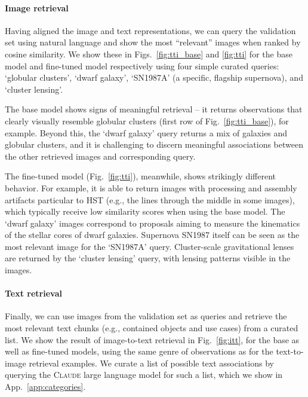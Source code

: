 \documentclass[10pt]{article} %
\begin{document}
\paragraph*{Image retrieval}

Having aligned the image and text representations, we can query the validation set using natural language and show the most ``relevant'' images when ranked by cosine similarity. We show these in Figs.~\ref{fig:tti_base} and \ref{fig:tti} for the base model and fine-tuned model respectively using four simple curated queries: `globular clusters', `dwarf galaxy', `SN1987A' (a specific, flagship supernova), and `cluster lensing'.

The base model shows signs of meaningful retrieval -- it returns observations that clearly visually resemble globular clusters (first row of Fig.~\ref{fig:tti_base}), for example. Beyond this, the `dwarf galaxy' query returns a mix of galaxies and globular clusters, and it is challenging to discern meaningful associations between the other retrieved images and corresponding query.

The fine-tuned model (Fig.~\ref{fig:tti}), meanwhile, shows strikingly different behavior. For example, it is able to return images with processing and assembly artifacts particular to HST (e.g., the lines through the middle in some images), which typically receive low similarity scores when using the base model. The `dwarf galaxy' images correspond to proposals aiming to measure the kinematics of the stellar cores of dwarf galaxies. Supernova SN1987 itself can be seen as the most relevant image for the `SN1987A' query. Cluster-scale gravitational lenses are returned by the `cluster lensing' query, with lensing patterns visible in the images.

\paragraph*{Text retrieval}

Finally, we can use images from the validation set as queries and retrieve the most relevant text chunks (e.g., contained objects and use cases) from a curated list. We show the result of image-to-text retrieval in Fig.~\ref{fig:itt}, for the base as well as fine-tuned models, using the same genre of observations as for the text-to-image retrieval examples. We curate a list of possible text associations by querying the \textsc{Claude} large language model for such a list, which we show in App.~\ref{app:categories}.
\end{document}
